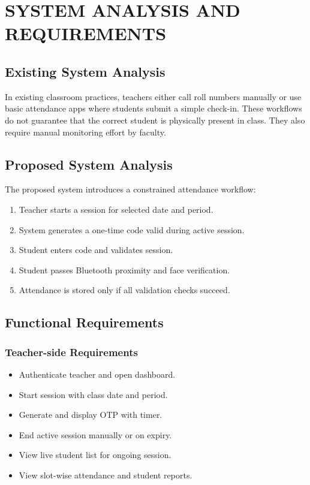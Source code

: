 \chapter{SYSTEM ANALYSIS AND REQUIREMENTS} \label{c3}
\section{Existing System Analysis}
In existing classroom practices, teachers either call roll numbers manually or use basic attendance apps where students submit a simple check-in. These workflows do not guarantee that the correct student is physically present in class. They also require manual monitoring effort by faculty.

\section{Proposed System Analysis}
The proposed system introduces a constrained attendance workflow:
\begin{enumerate}
\item Teacher starts a session for selected date and period.
\item System generates a one-time code valid during active session.
\item Student enters code and validates session.
\item Student passes Bluetooth proximity and face verification.
\item Attendance is stored only if all validation checks succeed.
\end{enumerate}

\section{Functional Requirements}
\subsection{Teacher-side Requirements}
\begin{itemize}
\item Authenticate teacher and open dashboard.
\item Start session with class date and period.
\item Generate and display OTP with timer.
\item End active session manually or on expiry.
\item View live student list for ongoing session.
\item View slot-wise attendance and student reports.
\end{itemize}

